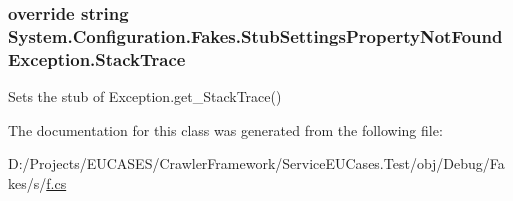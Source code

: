 \hypertarget{class_system_1_1_configuration_1_1_fakes_1_1_stub_settings_property_not_found_exception_a2c0bf5aaee923dd58962e352ddea5fd5}{
\subsubsection[{Stack\-Trace}]{\setlength{\rightskip}{0pt plus 5cm}override string System.\-Configuration.\-Fakes.\-Stub\-Settings\-Property\-Not\-Found\-Exception.\-Stack\-Trace\hspace{0.3cm}{\ttfamily [get]}}}\label{class_system_1_1_configuration_1_1_fakes_1_1_stub_settings_property_not_found_exception_a2c0bf5aaee923dd58962e352ddea5fd5}


Sets the stub of Exception.\-get\-\_\-\-Stack\-Trace()



The documentation for this class was generated from the following file\-:\begin{DoxyCompactItemize}
\item 
D\-:/\-Projects/\-E\-U\-C\-A\-S\-E\-S/\-Crawler\-Framework/\-Service\-E\-U\-Cases.\-Test/obj/\-Debug/\-Fakes/s/\hyperlink{s_2f_8cs}{f.\-cs}\end{DoxyCompactItemize}

